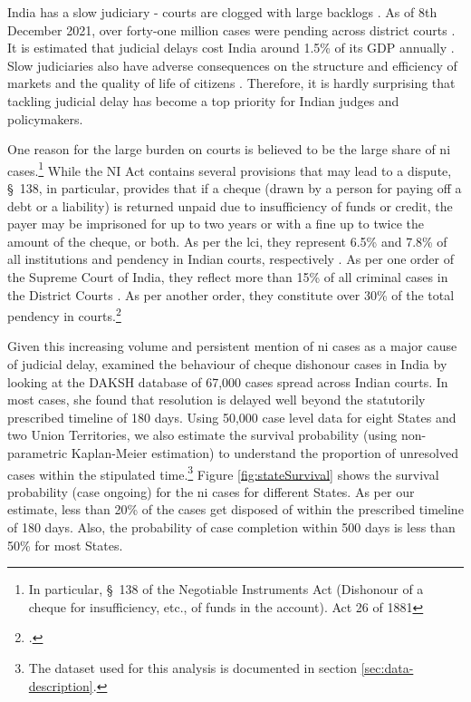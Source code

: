 India has a slow judiciary - courts are clogged with large backlogs \autocite{moog1992delays, debroy2008justice, dutta2019modernise}. As of 8th December 2021, over forty-one million cases were pending across district courts \autocite{njdg2021}. It is estimated that judicial delays cost India around 1.5\% of its GDP annually \autocite{dey2016_cost}. Slow judiciaries also have adverse consequences on the structure and efficiency of markets and the quality of life of citizens \autocite{world2004world, chemin2007impact, rao2020institutional}. Therefore, it is hardly surprising that tackling judicial delay has become a top priority for Indian judges and policymakers.

One reason for the large burden on courts is believed to be the large share of \gls{ni} cases.\footnote{In particular, \S~138 of the Negotiable Instruments Act (Dishonour of a cheque for insufficiency, etc., of funds in the account). Act 26 of 1881} While the NI Act contains several provisions that may lead to a dispute, \S~138, in particular, provides that if a cheque (drawn by a person for paying off a debt or a liability) is returned unpaid due to insufficiency of funds or credit, the payer may be imprisoned for up to two years or with a fine up to twice the amount of the cheque, or both. As per the \gls{lci}, they represent 6.5\% and 7.8\% of all institutions and pendency in Indian courts, respectively \autocite{lci2014_arrears}. As per one order of the Supreme Court of India, they reflect more than 15\% of all criminal cases in the District Courts \autocite{sc2020_makwanavstate}. As per another order, they constitute over 30\% of the total pendency in courts.\footcite[Similarly, a study published by the Department of Justice briefly touches on the burden of such cases on the judiciary and posits that they constitute 34\% of pending criminal cases in Maharashtra.][]{sc2020_138, mahadik2018_maharashtra}

Given this increasing volume and persistent mention of \gls{ni} cases as a major cause of judicial delay, \cite{sridhar2017_cheque} examined the behaviour of cheque dishonour cases in India by looking at the DAKSH database of 67,000 cases spread across Indian courts. In most cases, she found that resolution is delayed well beyond the statutorily prescribed timeline of 180 days. Using 50,000 case level data for eight States and two Union Territories, we also estimate the survival probability (using non-parametric Kaplan-Meier estimation) to understand the proportion of unresolved cases within the stipulated time.\footnote{The dataset used for this analysis is documented in section \ref{sec:data-description}.} Figure \ref{fig:stateSurvival} shows the survival probability (case ongoing) for the \gls{ni} cases for different States. As per our estimate, less than 20\% of the cases get disposed of within the prescribed timeline of 180 days. Also, the probability of case completion within 500 days is less than 50\% for most States.

